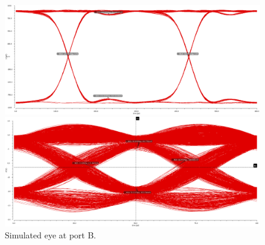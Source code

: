 \documentclass{book}  %
\begin{document}
\begin{paper}
\begin{figure}[htbp!]
	\captionsetup[subfigure]{justification=centering}
	\begin{minipage}[tb]{0.5\textwidth}
		\centering	
		\includegraphics[width=\textwidth]{./img/channel_response_eye_diagram/3gbp_eye_total_before_dfe.png}
	\end{minipage}%
	\begin{minipage}[tb]{0.5\textwidth}
		\centering	
		\includegraphics[width=\textwidth]{./img/channel_response_eye_diagram/20gbp_eye_total_before_dfe.png}
	\end{minipage}%
	\label{fig:eye_total_port_B}
	\caption{Simulated eye at port B.}
\end{figure}


\end{paper}
\end{document}
